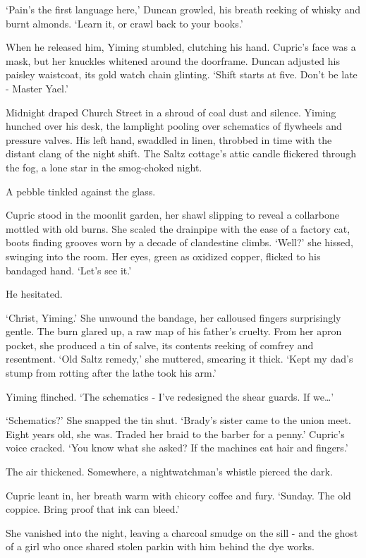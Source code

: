 `Pain's the first language here,' Duncan growled, his breath reeking of whisky and burnt almonds. `Learn it, or crawl back to your books.'

When he released him, Yiming stumbled, clutching his hand. Cupric's face was a mask, but her knuckles whitened around the doorframe. Duncan adjusted his paisley waistcoat, its gold watch chain glinting. `Shift starts at five. Don't be late - Master Yael.'

Midnight draped Church Street in a shroud of coal dust and silence. Yiming hunched over his desk, the lamplight pooling over schematics of flywheels and pressure valves. His left hand, swaddled in linen, throbbed in time with the distant clang of the night shift. The Saltz cottage's attic candle flickered through the fog, a lone star in the smog-choked night.

A pebble tinkled against the glass.

Cupric stood in the moonlit garden, her shawl slipping to reveal a collarbone mottled with old burns. She scaled the drainpipe with the ease of a factory cat, boots finding grooves worn by a decade of clandestine climbs. `Well?' she hissed, swinging into the room. Her eyes, green as oxidized copper, flicked to his bandaged hand. `Let's see it.'

He hesitated.

`Christ, Yiming.' She unwound the bandage, her calloused fingers surprisingly gentle. The burn glared up, a raw map of his father's cruelty. From her apron pocket, she produced a tin of salve, its contents reeking of comfrey and resentment. `Old Saltz remedy,' she muttered, smearing it thick. `Kept my dad's stump from rotting after the lathe took his arm.'

Yiming flinched. `The schematics - I've redesigned the shear guards. If we\dots'

`Schematics?' She snapped the tin shut. `Brady's sister came to the union meet. Eight years old, she was. Traded her braid to the barber for a penny.' Cupric's voice cracked. `You know what she asked? If the machines eat hair and fingers.'

The air thickened. Somewhere, a nightwatchman's whistle pierced the dark.

Cupric leant in, her breath warm with chicory coffee and fury. `Sunday. The old coppice. Bring proof that ink can bleed.'

She vanished into the night, leaving a charcoal smudge on the sill - and the ghost of a girl who once shared stolen parkin with him behind the dye works.

